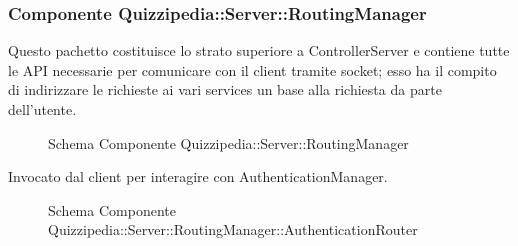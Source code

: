 \subsubsection{Componente Quizzipedia::Server::RoutingManager}
Questo pachetto costituisce lo strato superiore a ControllerServer e contiene tutte le API necessarie per comunicare con il client tramite socket; esso ha il compito di indirizzare le richieste ai vari services un base alla richiesta da parte dell'utente.
\begin{figure}[H]
\centering
\noindent{}
\caption{Schema Componente Quizzipedia::Server::RoutingManager}
\end{figure}
Invocato dal client per interagire con AuthenticationManager.
\begin{figure}[H]
\centering
\noindent{}
\caption{Schema Componente Quizzipedia::Server::RoutingManager::AuthenticationRouter}
\end{figure}

